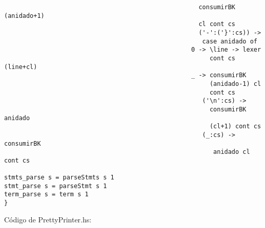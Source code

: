 \documentclass[12pt, a4paper]{article}
\begin{document}
\begin{Verbatim}
		                                             consumirBK (anidado+1)
		                                             cl cont cs	
		                                             ('-':('}':cs)) ->
		                                              case anidado of
			                                       0 -> \line -> lexer
			                                            cont cs (line+cl)
			                                       _ -> consumirBK
			                                            (anidado-1) cl
			                                            cont cs
		                                              ('\n':cs) ->
		                                                consumirBK anidado
		                                                (cl+1) cont cs
		                                              (_:cs) -> consumirBK
		                                                 anidado cl cont cs     
                                           
stmts_parse s = parseStmts s 1
stmt_parse s = parseStmt s 1
term_parse s = term s 1
}
\end{Verbatim}
Código de PrettyPrinter.hs:
\end{document}

